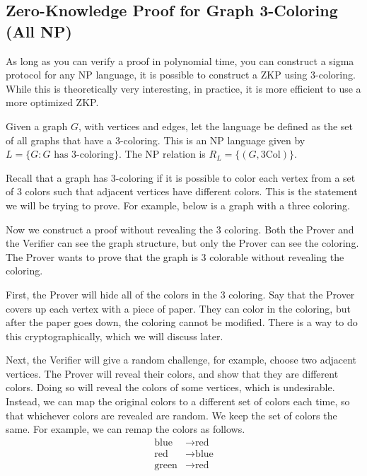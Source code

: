 \subsection{Zero-Knowledge Proof for Graph 3-Coloring (All NP)}

\begin{remark}
    As long as you can verify a proof in polynomial time, you can construct a sigma protocol for any NP language, it is possible to construct a ZKP using 3-coloring. While this is theoretically very interesting, in practice, it is more efficient to use a more optimized ZKP.
\end{remark}

Given a graph $G$, with vertices and edges, let the language be defined as the set of all graphs that have a 3-coloring. This is an NP language given by $L = \{ G: G \text{ has 3-coloring}\}$. The NP relation is $R_L = \{ (G, \text{3Col})\}$. 

Recall that a graph has 3-coloring if it is possible to color each vertex from a set of 3 colors such that adjacent vertices have different colors. This is the statement we will be trying to prove. For example, below is a graph with a three coloring.

\begin{center}
\end{center}

Now we construct a proof without revealing the 3 coloring. Both the Prover and the Verifier can see the graph structure, but only the Prover can see the coloring. The Prover wants to prove that the graph is 3 colorable without revealing the coloring.

First, the Prover will hide all of the colors in the 3 coloring. Say that the Prover covers up each vertex with a piece of paper. They can color in the coloring, but after the paper goes down, the coloring cannot be modified. There is a way to do this cryptographically, which we will discuss later.

Next, the Verifier will give a random challenge, for example, choose two adjacent vertices. The Prover will reveal their colors, and show that they are different colors. Doing so will reveal the colors of some vertices, which is undesirable. Instead, we can map the original colors to a different set of colors each time, so that whichever colors are revealed are random. We keep the set of colors the same. For example, we can remap the colors as follows.
\begin{align*}
    \text{blue} &\to \text{red}\\
    \text{red} &\to \text{blue}\\
    \text{green} &\to \text{red}
\end{align*}

